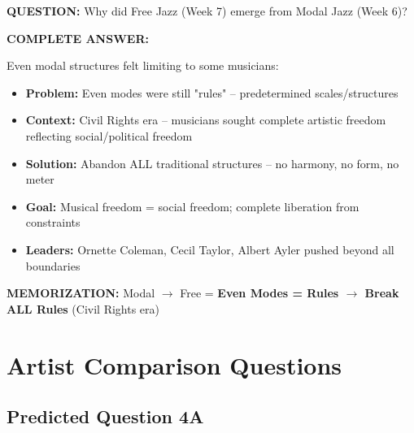 \documentclass[11pt]{article}
\begin{document}
\begin{mdframed}[backgroundcolor=questioncolor!10, linewidth=2pt]
\textbf{\textcolor{questioncolor}{QUESTION:}} Why did Free Jazz (Week 7) emerge from Modal Jazz (Week 6)?
\end{mdframed}

\begin{mdframed}[backgroundcolor=answercolor!10, linewidth=2pt]
\textbf{\textcolor{answercolor}{COMPLETE ANSWER:}}

Even modal structures felt limiting to some musicians:

\begin{itemize}[leftmargin=*, nosep]
    \item \textbf{Problem:} Even modes were still "rules" – predetermined scales/structures
    \item \textbf{Context:} Civil Rights era – musicians sought complete artistic freedom reflecting social/political freedom
    \item \textbf{Solution:} Abandon ALL traditional structures – no harmony, no form, no meter
    \item \textbf{Goal:} Musical freedom = social freedom; complete liberation from constraints
    \item \textbf{Leaders:} Ornette Coleman, Cecil Taylor, Albert Ayler pushed beyond all boundaries
\end{itemize}

\vspace{5pt}
\end{mdframed}

\textbf{MEMORIZATION:} Modal $\rightarrow$ Free = \textbf{Even Modes = Rules $\rightarrow$ Break ALL Rules} (Civil Rights era)

\newpage

\section{Artist Comparison Questions}

\subsection*{Predicted Question 4A}
\end{document}
